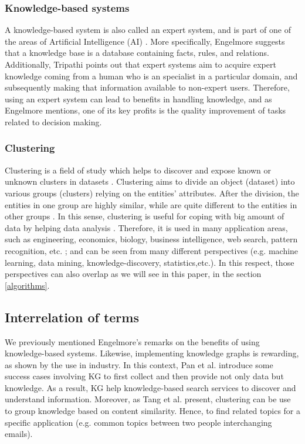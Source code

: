 \documentclass[runningheads]{llncs}
\begin{document}
\subsubsection{Knowledge-based systems} \label{knowledge-based}
A knowledge-based system is also called an expert system, and is part of one of the areas of Artificial Intelligence (AI) \cite{Tripathi}. More specifically, Engelmore \cite{Engelmore} suggests that a knowledge base is a database containing facts, rules, and relations. Additionally, Tripathi \cite{Tripathi} points out that expert systems aim to acquire expert knowledge coming from a human who is an specialist in a particular domain, and subsequently making that information available to non-expert users.
Therefore, using an expert system can lead to benefits in handling knowledge, and as Engelmore \cite{Engelmore} mentions, one of its key profits is the quality improvement of tasks related to decision making.


\subsubsection{Clustering} \label{clustering}
Clustering is a field of study which helps to discover and expose known or unknown clusters in datasets \cite{Han} \cite{Mirkin}. Clustering aims to divide an object (dataset) into various groups (clusters) relying on the entities' attributes. After the division, the entities in one group are highly similar, while are quite different to the entities in other groups \cite{Han}. In this sense, clustering is useful for coping with big amount of data by helping data analysis \cite{Pedrycz} \cite{Mirkin}. Therefore, it is used in many application areas, such as engineering, economics, biology, business intelligence, web search, pattern recognition, etc. \cite{Pedrycz} \cite{Han}; and can be seen from many different perspectives (e.g. machine learning, data mining, knowledge-discovery, statistics,etc.). In this respect, those perspectives can also overlap as we will see in this paper, in the section \ref{algorithms}.


\subsection{Interrelation of terms} \label{interrelation}
We previously mentioned Engelmore's remarks on the benefits of using knowledge-based systems. Likewise, implementing knowledge graphs is rewarding, as shown by the use in industry. In this context, Pan et al. \cite{Pan} introduce some success cases involving KG to first collect and then provide not only data but knowledge. As a result, KG help knowledge-based search services to discover and understand information. Moreover, as Tang et al. \cite{Tang} present, clustering can be use to group knowledge based on content similarity. Hence, to find related topics for a specific application (e.g. common topics between two people interchanging emails).
\end{document}
